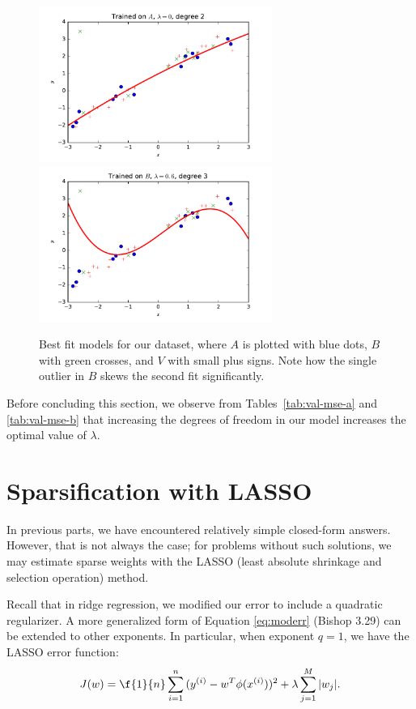 \documentclass{article}
\begin{document}
\begin{multicols}{2}
\begin{figure}
   \centering
   \includegraphics[width=3in]{img/3-2_lambda0_degree2.pdf} 
   \includegraphics[width=3in]{img/3-2_lambda6_degree3.pdf} 
   \caption{Best fit models for our dataset, where $A$ is plotted with blue dots, $B$ with green crosses, and $V$ with small plus signs. Note how the single outlier in $B$ skews the second fit significantly.}
   \label{fig:3-2-bestfit}
\end{figure}

Before concluding this section, we observe from Tables~\ref{tab:val-mse-a} and \ref{tab:val-mse-b} that increasing the degrees of freedom in our model increases the optimal value of $\lambda$.



\section{Sparsification with LASSO}

In previous parts, we have encountered relatively simple closed-form answers. However, that is not always the case; for problems without such solutions, we may estimate sparse weights with the LASSO (least absolute shrinkage and selection operation) method.

Recall that in ridge regression, we modified our error to include a quadratic regularizer. A more generalized form of Equation \ref{eq:moderr} (Bishop 3.29) can be extended to other exponents. In particular, when exponent $q=1$, we have the LASSO error function:
\begin{equation}J(w) = \f{1}{n}\sum_{i=1}^n{(y^{(i)}-w^T\phi(x^{(i)}))^2} + \lambda \sum_{j=1}^M{|w_j|}.\end{equation}


\end{multicols}
\end{document}
